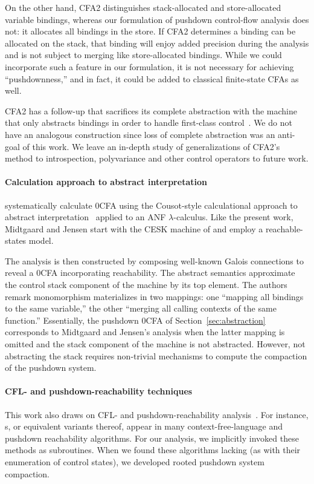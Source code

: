 On the other hand, CFA2 distinguishes stack-allocated and
store-allocated variable bindings, whereas our formulation of pushdown
control-flow analysis does not: it allocates all bindings in the
store.
If CFA2 determines a binding can be allocated on the stack, that
binding will enjoy added precision during the analysis and is not
subject to merging like store-allocated bindings.
While we could incorporate such a feature in our formulation,
it is not necessary for achieving ``pushdownness,''
and in fact, it could be added to classical finite-state CFAs as well.


CFA2 has a follow-up that sacrifices its complete abstraction with the machine that only abstracts bindings in order to handle first-class control~\citep{dvanhorn:Vardoulakis2011Pushdown}.
We do not have an analogous construction since loss of complete abstraction was an anti-goal of this work.
We leave an in-depth study of generalizations of CFA2's method to introspection, polyvariance and other control operators to future work.


\paragraph{Calculation approach to abstract interpretation}

\citet{dvanhorn:Midtgaard2009Controlflow} 
systematically calculate
0CFA using the Cousot-style calculational approach to abstract
interpretation~\cite{dvanhorn:Cousot98-5} applied to an ANF
$\lambda$-calculus.
Like the present work, Midtgaard and Jensen start with the CESK
machine of \citet{mattmight:Flanagan:1993:ANF} and employ a
reachable-states model. 

The analysis is then constructed by composing well-known
Galois connections to reveal a 0CFA incorporating reachability.
The abstract semantics approximate the control stack component of the
machine by its top element.
The authors remark monomorphism materializes in two mappings: one
``mapping all bindings to the same variable,'' the other ``merging all
calling contexts of the same function.''
Essentially, the pushdown 0CFA of Section~\ref{sec:abstraction}
corresponds to Midtgaard and Jensen's analysis when the latter
mapping is omitted and the stack component of the machine is not
abstracted.
However, not abstracting the stack requires non-trivial mechanisms to compute the compaction of the pushdown system.

\paragraph{CFL- and pushdown-reachability techniques}
This work also draws on CFL- and pushdown-reachability
analysis~\cite{mattmight:Bouajjani:1997:PDA-Reachability,dvanhorn:Kodumal2004Set,mattmight:Reps:1998:CFL,mattmight:Reps:2005:Weighted-PDA}.
For instance, \ecg s, or equivalent variants thereof, appear in many
context-free-language and pushdown reachability algorithms.
For our analysis, we implicitly invoked these methods as subroutines.
When we found these algorithms lacking (as with their enumeration of
control states), we developed rooted pushdown system compaction.


